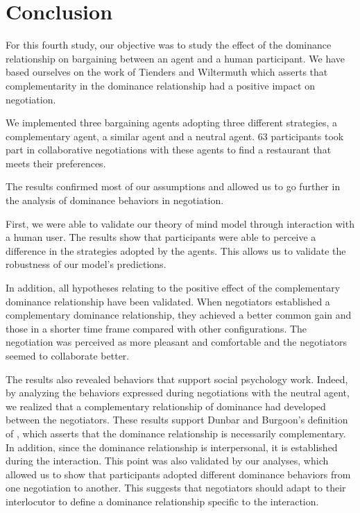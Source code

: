 \documentclass{llncs}
\begin{document}

\section{Conclusion}

For this fourth study, our objective was to study the effect of the dominance relationship on bargaining between an agent and a human participant. We have based ourselves on the work of Tienders and Wiltermuth \cite{wiltermuth2009benefits,tiedens2003power} which asserts that complementarity in the dominance relationship had a positive impact on negotiation. 

We implemented three bargaining agents adopting three different strategies, a complementary agent, a similar agent and a neutral agent. 
63 participants took part in collaborative negotiations with these agents to find a restaurant that meets their preferences. 

The results confirmed most of our assumptions and allowed us to go further in the analysis of dominance behaviors in negotiation. 

First, we were able to validate our theory of mind model through interaction with a human user. 
The results show that participants were able to perceive a difference in the strategies adopted by the agents. This allows us to validate the robustness of our model's predictions. 

In addition, all hypotheses relating to the positive effect of the complementary dominance relationship have been validated. When negotiators established a complementary dominance relationship, they achieved a better common gain and those in a shorter time frame compared with other configurations. The negotiation was perceived as more pleasant and comfortable and the negotiators seemed to collaborate better. 

The results also revealed behaviors that support social psychology work. Indeed, by analyzing the behaviors expressed during negotiations with the neutral agent, we realized that a complementary relationship of dominance had developed between the negotiators. These results support Dunbar and Burgoon's definition of \cite{dunbar2005perceptions}, which asserts that the dominance relationship is necessarily complementary. In addition, since the dominance relationship is interpersonal, it is established during the interaction. This point was also validated by our analyses, which allowed us to show that participants adopted different dominance behaviors from one negotiation to another. This suggests that negotiators should adapt to their interlocutor to define a dominance relationship specific to the interaction. 	
\end{document}
